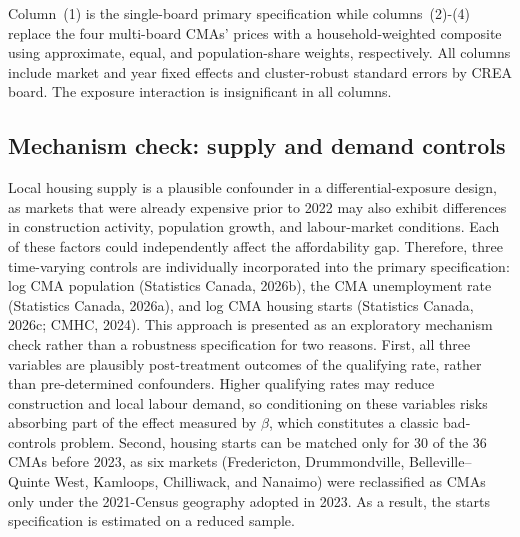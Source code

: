 \documentclass[12pt]{article}
\begin{document}
Column~(1) is the single-board primary specification while columns~(2)-(4) replace the four multi-board CMAs' prices with a household-weighted composite using approximate, equal, and population-share weights, respectively. All columns include market and year fixed effects and cluster-robust standard errors by CREA board. The exposure interaction is insignificant in all columns.


\subsection{Mechanism check: supply and demand controls}
\label{sec:mechanism}

Local housing supply is a plausible confounder in a differential-exposure design, as markets that were already expensive prior to 2022 may also exhibit differences in construction activity, population growth, and labour-market conditions. Each of these factors could independently affect the affordability gap. Therefore, three time-varying controls are individually incorporated into the primary specification: log CMA population (Statistics Canada, 2026b), the CMA unemployment rate (Statistics Canada, 2026a), and log CMA housing starts (Statistics Canada, 2026c; CMHC, 2024). This approach is presented as an exploratory mechanism check rather than a robustness specification for two reasons. First, all three variables are plausibly post-treatment outcomes of the qualifying rate, rather than pre-determined confounders. Higher qualifying rates may reduce construction and local labour demand, so conditioning on these variables risks absorbing part of the effect measured by $\beta$, which constitutes a classic bad-controls problem. Second, housing starts can be matched only for 30 of the 36 CMAs before 2023, as six markets (Fredericton, Drummondville, Belleville--Quinte West, Kamloops, Chilliwack, and Nanaimo) were reclassified as CMAs only under the 2021-Census geography adopted in 2023. As a result, the starts specification is estimated on a reduced sample.
\end{document}
